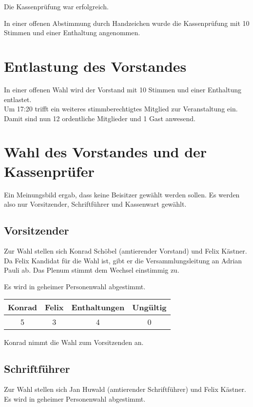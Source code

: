 \documentclass{scrartcl}
\begin{document}
Die Kassenprüfung war erfolgreich.

In einer offenen Abstimmung durch Handzeichen wurde die Kassenprüfung
mit 10 Stimmen und einer Enthaltung angenommen.

\section{Entlastung des Vorstandes}
In einer offenen Wahl wird der Vorstand mit 10 Stimmen und einer
Enthaltung entlastet.\\[1ex]

Um 17:20 trifft ein weiteres stimmberechtigtes Mitglied zur
Veranstaltung ein. Damit sind nun 12 ordentliche Mitglieder und 1 Gast
anwesend.

\section{Wahl des Vorstandes und der Kassenprüfer}

Ein Meinungsbild ergab, dass keine Beisitzer gewählt werden sollen. Es
werden also nur Vorsitzender, Schriftführer und Kassenwart gewählt.

\subsection{Vorsitzender}
Zur Wahl stellen sich Konrad Schöbel (amtierender Vorstand) und Felix
Kästner. Da Felix Kandidat für die Wahl ist, gibt er die
Versammlungsleitung an Adrian Pauli ab. Das Plenum stimmt dem Wechsel
einstimmig zu.

Es wird in geheimer Personenwahl abgestimmt.

\begin{table}[h!]
    \centering
    \begin{tabular}{c|c|c|c}
        \textbf{Konrad} & \textbf{Felix} & \textbf{Enthaltungen} &
\textbf{Ungültig} \\ \hline
        5 & 3 & 4 & 0 \\
    \end{tabular}
\end{table}

Konrad nimmt die Wahl zum Vorsitzenden an.

\subsection{Schriftführer}
Zur Wahl stellen sich Jan Huwald (amtierender Schriftführer) und Felix
Kästner. Es wird in geheimer Personenwahl abgestimmt.
\end{document}
